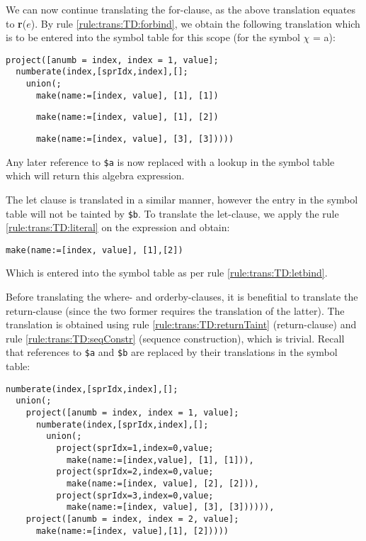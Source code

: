 We can now continue translating the for-clause, as the above translation
equates to \textbf{r}($e$). By rule \ref{rule:trans:TD:forbind}, we obtain the
following translation which is to be entered into the symbol table for this
scope (for the symbol $\chi$ = a):

\begin{Verbatim}
project([anumb = index, index = 1, value];
  numberate(index,[sprIdx,index],[];
    union(;
      make(name:=[index, value], [1], [1])
      \end{Verbatim}
      \begin{Verbatim}
      make(name:=[index, value], [1], [2])
      \end{Verbatim}
      \begin{Verbatim}
      make(name:=[index, value], [3], [3]))))
\end{Verbatim}

Any later reference to \texttt{\$a} is now replaced with a lookup in the symbol
table which will return this algebra expression.

The let clause is translated in a similar manner, however the entry in the
symbol table will not be tainted by \texttt{\$b}. To translate the let-clause,
we apply the rule \ref{rule:trans:TD:literal} on the expression and obtain:

\begin{Verbatim}
make(name:=[index, value], [1],[2])
\end{Verbatim}

Which is entered into the symbol table as per rule \ref{rule:trans:TD:letbind}.

Before translating the where- and orderby-clauses, it is benefitial to
translate the return-clause (since the two former requires the translation of
the latter). The translation is obtained using rule
\ref{rule:trans:TD:returnTaint} (return-clause) and rule
\ref{rule:trans:TD:seqConstr} (sequence construction), which is trivial. Recall
that references to \texttt{\$a} and \texttt{\$b} are replaced by their
translations in the symbol table:

\begin{Verbatim}
numberate(index,[sprIdx,index],[];
  union(;
    project([anumb = index, index = 1, value];
      numberate(index,[sprIdx,index],[];
        union(;
          project(sprIdx=1,index=0,value;
            make(name:=[index,value], [1], [1])),
          project(sprIdx=2,index=0,value;
            make(name:=[index, value], [2], [2])),
          project(sprIdx=3,index=0,value;
            make(name:=[index, value], [3], [3]))))),
    project([anumb = index, index = 2, value];
      make(name:=[index, value],[1], [2]))))
\end{Verbatim}

